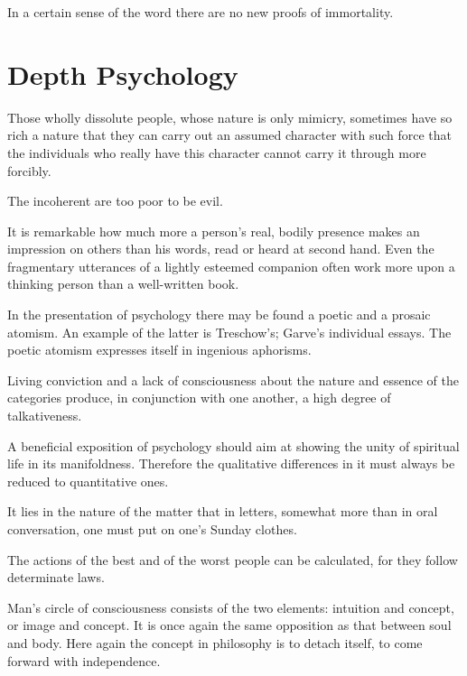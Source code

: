 \documentclass[12pt,a4paper]{article}
\newcommand{\opage}[1]{\marginnote{\footnotesize\textit{[#1]}}}
\newcommand{\aphsep}{\par\smallskip\centerline{\textasteriskcentered}\smallskip}
\begin{document}
\aphsep

In a certain sense of the word there are no new proofs of immortality.

\bigskip

\section*{Depth Psychology}
\label{ch:010}

Those wholly dissolute people, whose nature is only mimicry, sometimes have so
rich a nature that they can carry out an assumed character with such force that the
individuals who really have this character cannot carry it through more forcibly.

\aphsep

The incoherent are too poor to be evil.

\aphsep

It is remarkable how much more a person's real, bodily presence makes an
impression on others than his words, read or heard at second hand. Even the
fragmentary utterances of a lightly esteemed companion often work more upon a
thinking person than a well-written book.

\aphsep

In the presentation of psychology there may be found a poetic and a prosaic
atomism. An example of the latter is Treschow's; Garve's individual essays. The
poetic atomism expresses itself in ingenious aphorisms.

\aphsep

Living conviction and a lack of consciousness about the nature and essence of the
categories produce, in conjunction with one another, a high degree of
talkativeness.

\aphsep

\opage{50}A beneficial exposition of psychology should aim at showing the unity of
spiritual life in its manifoldness. Therefore the qualitative differences in it
must always be reduced to quantitative ones.

\aphsep

It lies in the nature of the matter that in letters, somewhat more than in oral
conversation, one must put on one's Sunday clothes.

\aphsep

The actions of the best and of the worst people can be calculated, for they follow
determinate laws.

\aphsep

Man's circle of consciousness consists of the two elements: intuition and concept,
or image and concept. It is once again the same opposition as that between soul
and body. Here again the concept in philosophy is to detach itself, to come
forward with independence.
\end{document}
